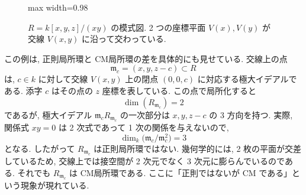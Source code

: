 \documentclass[article,paper=b5paper]{jlreq}
\begin{document}
\begin{figure}[H]
\begin{adjustbox}{max width=0.98\linewidth}
    \end{adjustbox}
    \caption{$R=k[x,y,z]/(xy)$ の模式図. 2 つの座標平面 $V(x),V(y)$ が交線 $V(x,y)$ に沿って交わっている.}
    \label{fig:cm-overview}
\end{figure}

この例は, 正則局所環と CM局所環の差を具体的にも見せている. 交線上の点
\[
    \mathfrak{m}_c=(x,y,z-c)\subset R
\]
は, $c\in k$ に対して交線 $V(x,y)$ 上の閉点 $(0,0,c)$ に対応する極大イデアルである.
添字 $c$ はその点の $z$ 座標を表している. この点で局所化すると
\[
    \dim(R_{\mathfrak{m}_c})=2
\]
であるが, 極大イデアル
$\mathfrak{m}_cR_{\mathfrak{m}_c}$ の一次部分は $x,y,z-c$ の 3 方向を持つ.
実際, 関係式 $xy=0$ は 2 次式であって 1 次の関係を与えないので,
\[
    \dim_{k}\bigl(\mathfrak{m}_c/\mathfrak{m}_c^2\bigr)=3
\]
となる. したがって $R_{\mathfrak{m}_c}$ は正則局所環ではない. 幾何学的には,
2 枚の平面が交差しているため, 交線上では接空間が 2 次元でなく 3 次元に膨らんでいるのである.
それでも $R_{\mathfrak{m}_c}$ は CM局所環である. ここに「正則ではないが CM である」という現象が現れている.
\end{document}
